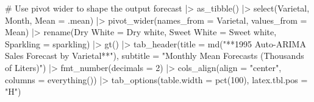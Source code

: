 \documentclass[
  letterpaper,
  DIV=11,
  numbers=noendperiod]{scrartcl}
\newenvironment{Shaded}{\begin{snugshade}}{\end{snugshade}}
\newcommand{\AttributeTok}[1]{\textcolor[rgb]{0.40,0.45,0.13}{#1}}
\newcommand{\CommentTok}[1]{\textcolor[rgb]{0.37,0.37,0.37}{#1}}
\newcommand{\DecValTok}[1]{\textcolor[rgb]{0.68,0.00,0.00}{#1}}
\newcommand{\FunctionTok}[1]{\textcolor[rgb]{0.28,0.35,0.67}{#1}}
\newcommand{\NormalTok}[1]{\textcolor[rgb]{0.00,0.23,0.31}{#1}}
\newcommand{\OtherTok}[1]{\textcolor[rgb]{0.00,0.23,0.31}{#1}}
\newcommand{\SpecialCharTok}[1]{\textcolor[rgb]{0.37,0.37,0.37}{#1}}
\newcommand{\StringTok}[1]{\textcolor[rgb]{0.13,0.47,0.30}{#1}}
\begin{document}
\begin{Shaded}
\begin{Highlighting}[]
\CommentTok{\# Use pivot wider to shape the output}
\NormalTok{forecast }\SpecialCharTok{|\textgreater{}}
  \FunctionTok{as\_tibble}\NormalTok{() }\SpecialCharTok{|\textgreater{}}
  \FunctionTok{select}\NormalTok{(Varietal, Month, }\AttributeTok{Mean =}\NormalTok{ .mean) }\SpecialCharTok{|\textgreater{}}
  \FunctionTok{pivot\_wider}\NormalTok{(}\AttributeTok{names\_from =}\NormalTok{ Varietal, }\AttributeTok{values\_from =}\NormalTok{ Mean) }\SpecialCharTok{|\textgreater{}}
  \FunctionTok{rename}\NormalTok{(}\StringTok{\textasciigrave{}}\AttributeTok{Dry White}\StringTok{\textasciigrave{}} \OtherTok{=} \StringTok{\textasciigrave{}}\AttributeTok{Dry white}\StringTok{\textasciigrave{}}\NormalTok{, }\StringTok{\textasciigrave{}}\AttributeTok{Sweet White}\StringTok{\textasciigrave{}} \OtherTok{=} \StringTok{\textasciigrave{}}\AttributeTok{Sweet white}\StringTok{\textasciigrave{}}\NormalTok{, }\AttributeTok{Sparkling =}\NormalTok{ sparkling) }\SpecialCharTok{|\textgreater{}}
  \FunctionTok{gt}\NormalTok{() }\SpecialCharTok{|\textgreater{}}
  \FunctionTok{tab\_header}\NormalTok{(}\AttributeTok{title =} \FunctionTok{md}\NormalTok{(}\StringTok{"**1995 Auto{-}ARIMA Sales Forecast by Varietal**"}\NormalTok{),}
    \AttributeTok{subtitle =} \StringTok{"Monthly Mean Forecasts (Thousands of Liters)"}\NormalTok{) }\SpecialCharTok{|\textgreater{}}
  \FunctionTok{fmt\_number}\NormalTok{(}\AttributeTok{decimals =} \DecValTok{2}\NormalTok{) }\SpecialCharTok{|\textgreater{}}
  \FunctionTok{cols\_align}\NormalTok{(}\AttributeTok{align =} \StringTok{"center"}\NormalTok{, }\AttributeTok{columns =} \FunctionTok{everything}\NormalTok{()) }\SpecialCharTok{|\textgreater{}}
  \FunctionTok{tab\_options}\NormalTok{(}\AttributeTok{table.width =} \FunctionTok{pct}\NormalTok{(}\DecValTok{100}\NormalTok{), }\AttributeTok{latex.tbl.pos =} \StringTok{"H"}\NormalTok{)}
\end{Highlighting}
\end{Shaded}
\end{document}
